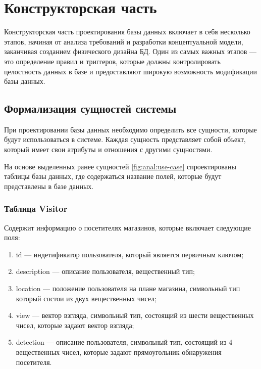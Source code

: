 \section{\large Конструкторская часть}

Конструкторская часть проектирования базы данных включает в себя несколько этапов, начиная от анализа требований и разработки концептуальной модели, заканчивая созданием физического дизайна БД. Один из самых важных этапов --- это определение правил и триггеров, которые должны контролировать целостность данных в базе и предоставляют широкую возможность модификации базы данных.

\subsection{Формализация сущностей системы}

При проектировании базы данных необходимо определить все сущности, которые будут использоваться в системе. Каждая сущность представляет собой объект, который имеет свои атрибуты и отношения с другими сущностями. 

На основе выделенных ранее сущностей \ref{fig:anal:use-case} спроектированы таблицы 
базы данных, где содержаться название полей, которые будут представлены в базе данных.

\subsubsection{Таблица Visitor}

Содержит информацию о посетителях магазинов, которые включает следующие поля:

\begin{enumerate}[label=\arabic*.]
    \item id --- индетификатор пользователя, который является первичным ключом;
    \item description --- описание пользователя, вещественный тип;
    \item location --- положение пользователя на плане магазина, символьный тип 
    который состои из двух вещественных чисел;
    \item view --- вектор взгляда, символьный тип, состоящий из шести вещественных
    чисел, которые задают вектор взгляда;
    \item detection --- описание пользователя, символьный тип, 
    состоящий из 4 вещественных
    чисел, которые задают прямоугольник обнаружения посетителя.
\end{enumerate}

